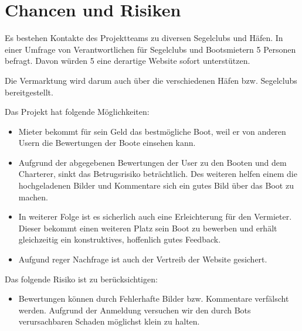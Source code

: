 \documentclass[12pt]{article}
\theoremstyle{definition}
\begin{document}
\pagebreak

\section{Chancen und Risiken}
Es bestehen Kontakte des Projektteams zu diversen Segelclubs und Häfen. In einer Umfrage von Verantwortlichen für Segelclubs und Bootsmietern 5 Personen befragt. Davon würden 5 eine derartige Website sofort unterstützen. 

Die Vermarktung wird  darum auch über die verschiedenen Häfen bzw. Segelclubs bereitgestellt.

Das Projekt hat folgende Möglichkeiten:
\begin{itemize}
\item Mieter bekommt für sein Geld das bestmögliche Boot, weil er von anderen Usern die Bewertungen der Boote einsehen kann.
\item Aufgrund der abgegebenen Bewertungen der User zu den Booten und dem Charterer, sinkt das Betrugsrisiko beträchtlich. Des weiteren helfen einem die hochgeladenen Bilder und Kommentare sich ein gutes Bild über das Boot zu machen.
\item In weiterer Folge ist es sicherlich auch eine Erleichterung für den Vermieter. Dieser bekommt einen weiteren Platz sein Boot zu bewerben und erhält gleichzeitig ein konstruktives, hoffenlich gutes Feedback.
\item Aufgund reger Nachfrage ist auch der Vertreib der Website gesichert.
\end{itemize}

Das folgende Risiko ist zu berücksichtigen:
\begin{itemize}
\item Bewertungen können durch Fehlerhafte Bilder bzw. Kommentare verfälscht werden. Aufgrund der Anmeldung versuchen wir den durch Bots verursachbaren Schaden möglichst klein zu halten.
\end{itemize}

\pagebreak
\end{document}
